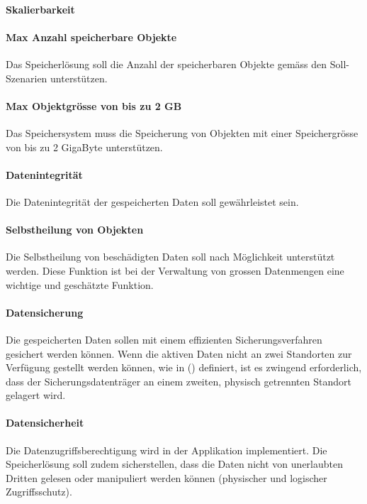 \setcounter{paragraph}{0}
\renewcommand\theparagraph{Soll-4-\arabic{paragraph}}

\paragraph{Skalierbarkeit}\label{Soll-4-1}

\paragraph{Max Anzahl speicherbare Objekte}\label{Soll-4-2}
Das Speicherlösung soll die Anzahl der speicherbaren Objekte gemäss den Soll-Szenarien unterstützen. 

\paragraph{Max Objektgrösse von bis zu 2 GB}\label{Soll-4-3}
Das Speichersystem muss die Speicherung von Objekten mit einer Speichergrösse von bis zu 2 GigaByte unterstützen.

\setcounter{paragraph}{0}
\renewcommand\theparagraph{Soll-5-\arabic{paragraph}}

\paragraph{Datenintegrität}\label{Soll-5-1}
Die Datenintegrität der gespeicherten Daten soll gewährleistet sein.

\paragraph{Selbstheilung von Objekten}\label{Soll-5-2}
Die Selbstheilung von beschädigten Daten soll nach Möglichkeit unterstützt werden. Diese Funktion ist bei der Verwaltung von grossen Datenmengen eine wichtige und geschätzte Funktion.

\paragraph{Datensicherung}\label{Soll-5-3}
Die gespeicherten Daten sollen mit einem effizienten Sicherungsverfahren gesichert werden können. Wenn die aktiven Daten nicht an zwei Standorten zur Verfügung gestellt werden können, wie in () definiert, ist es zwingend erforderlich, dass der Sicherungsdatenträger an einem zweiten, physisch getrennten Standort gelagert wird.

\paragraph{Datensicherheit}\label{Soll-5-4}
Die Datenzugriffsberechtigung wird in der Applikation implementiert. Die Speicherlösung soll zudem sicherstellen, dass die Daten nicht von unerlaubten Dritten gelesen oder manipuliert werden können (physischer und logischer Zugriffsschutz).

